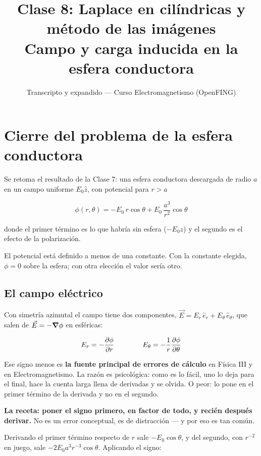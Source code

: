 \documentclass[12pt,a4paper]{article}
\title{\textbf{Clase 8: Laplace en cilíndricas y método de las imágenes} \\[0.3em]
        \large{Campo y carga inducida en la esfera conductora}}
\author{Transcripto y expandido --- Curso Electromagnetismo (OpenFING)}
\date{}
\begin{document}
\maketitle
\thispagestyle{empty}
\newpage

\tableofcontents
\newpage


\section{Cierre del problema de la esfera conductora}

Se retoma el resultado de la Clase 7: una esfera conductora descargada de radio
$a$ en un campo uniforme $E_0\hat z$, con potencial para $r > a$

\[
\phi(r,\theta) = -E_0\,r\cos\theta + E_0\,\frac{a^3}{r^2}\cos\theta
\]

donde el primer término es lo que habría sin esfera ($-E_0 z$) y el segundo es el
efecto de la polarización.

\begin{notebox}
El potencial está definido a menos de una constante. Con la constante elegida,
$\phi = 0$ sobre la esfera; con otra elección el valor sería otro.
\end{notebox}

\subsection{El campo eléctrico}

Con simetría azimutal el campo tiene dos componentes,
$\vec E = E_r\,\hat e_r + E_\theta\,\hat e_\theta$, que salen de
$\vec E = -\grad\phi$ en esféricas:

\[
E_r = -\pdv{\phi}{r}
\qquad\qquad
E_\theta = -\frac{1}{r}\pdv{\phi}{\theta}
\]

\begin{warnbox}
Ese signo menos es \textbf{la fuente principal de errores de cálculo} en Física
III y en Electromagnetismo. La razón es psicológica: como es lo fácil, uno lo deja
para el final, hace la cuenta larga llena de derivadas y se olvida. O peor: lo
pone en el primer término de la derivada y no en el segundo.

\textbf{La receta: poner el signo primero, en factor de todo, y recién después
derivar.} No es un error conceptual, es de distracción --- y por eso es tan común.
\end{warnbox}

Derivando el primer término respecto de $r$ sale $-E_0\cos\theta$, y del segundo,
con $r^{-2}$ en juego, sale $-2E_0 a^3 r^{-3}\cos\theta$. Aplicando el signo:
\end{document}

